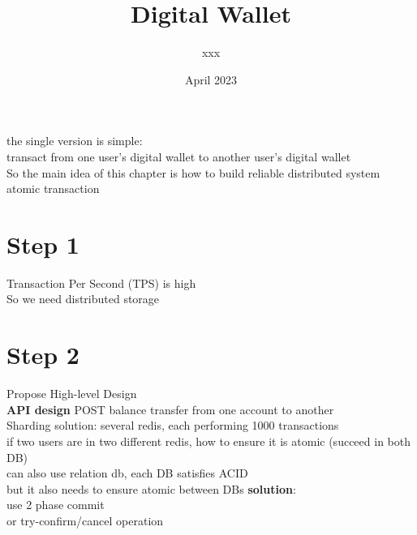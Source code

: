 \documentclass{article}
\title{Digital Wallet}
\author{xxx}
\date{April 2023}
\begin{document}
\maketitle
the single version is simple:\\
transact from one user's digital wallet to another user's digital wallet\\
So the main idea of this chapter is how to build reliable distributed system\\
atomic transaction\\
\section{Step 1}
Transaction Per Second (TPS) is high\\
So we need distributed storage\\
\section{Step 2}
Propose High-level Design\\
\textbf{API design}
POST balance transfer from one account to another\\
Sharding solution: several redis, each performing 1000 transactions\\
if two users are in two different redis, how to ensure it is atomic (succeed in both DB)\\
can also use relation db, each DB satisfies ACID\\
but it also needs to ensure atomic between DBs
\textbf{solution}:\\
use 2 phase commit\\
or try-confirm/cancel operation
\end{document}
